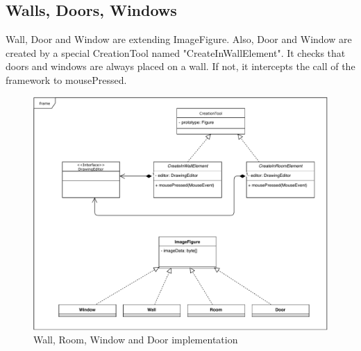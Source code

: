 \subsection{Walls, Doors, Windows}

Wall, Door and Window are extending ImageFigure.
Also, Door and Window are created by a special CreationTool named "CreateInWallElement".
It checks that doors and windows are always placed on a wall.
If not, it intercepts the call of the framework to mousePressed.

\begin{figure}[h]
    \includegraphics[keepaspectratio,width=\textwidth]{images/uml.pdf}
    \caption{Wall, Room, Window and Door implementation}
\end{figure}
